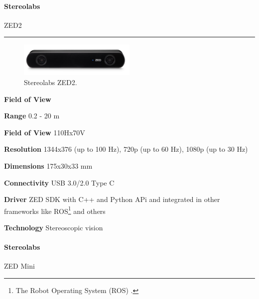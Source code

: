 \documentclass[../main.tex]{subfiles}
\begin{document}
\paragraph{\large \textbf{Stereolabs}} {\large ZED2}

\noindent\rule{8cm}{0.1pt}
\begin{figure}[H]
    \centering
    \includegraphics[width=0.5\textwidth]{images/zed2.png}
    \caption{Stereolabs ZED2.}
    \label{fig:zed2}
\end{figure}
\begin{labeling}{\textbf{Field of View    }}
    \setlength{\itemindent}{2em}
    \item [\textbf{Range}] 0.2 - 20 m
    \item [\textbf{Field of View}] 110Hx70V
    \item [\textbf{Resolution}] 1344x376 (up to 100 Hz), 720p (up to 60 Hz), 1080p (up to 30 Hz)
    \item [\textbf{Dimensions}] 175x30x33 mm
    \item [\textbf{Connectivity}] USB 3.0/2.0 Type C
    \item [\textbf{Driver}] ZED SDK with C++ and Python APi and integrated in other frameworks like ROS\footnote{The Robot Operating System (ROS) \cite{ROS_cite}.} and others
    \item [\textbf{Technology}] Stereoscopic vision
\end{labeling}
\vspace{1em}
\paragraph{\large \textbf{Stereolabs}} {\large ZED Mini}
\end{document}
